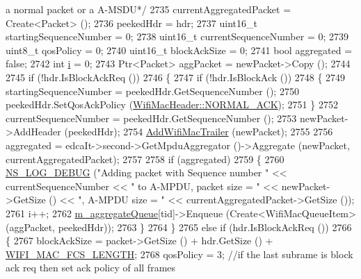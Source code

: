 \begin{DoxyCode}
{       a normal packet or a A-MSDU*/}
2735               currentAggregatedPacket = Create<Packet> ();
2736               peekedHdr = hdr;
2737               uint16\_t startingSequenceNumber = 0;
2738               uint16\_t currentSequenceNumber = 0;
2739               uint8\_t qosPolicy = 0;
2740               uint16\_t blockAckSize = 0;
2741               \textcolor{keywordtype}{bool} aggregated = \textcolor{keyword}{false};
2742               \textcolor{keywordtype}{int} \hyperlink{bernuolliDistribution_8m_a6f6ccfcf58b31cb6412107d9d5281426}{i} = 0;
2743               Ptr<Packet> aggPacket = newPacket->Copy ();
2744 
2745               \textcolor{keywordflow}{if} (!hdr.IsBlockAckReq ())
2746                 \{
2747                   \textcolor{keywordflow}{if} (!hdr.IsBlockAck ())
2748                     \{
2749                       startingSequenceNumber = peekedHdr.GetSequenceNumber ();
2750                       peekedHdr.SetQosAckPolicy (\hyperlink{classns3_1_1WifiMacHeader_ae3a382482f357972019f5e1b3162adc4a9f52b9c6ca65d046ce2be9d70bce28cf}{WifiMacHeader::NORMAL\_ACK});
2751                     \}
2752                   currentSequenceNumber = peekedHdr.GetSequenceNumber ();
2753                   newPacket->AddHeader (peekedHdr);
2754                   \hyperlink{classns3_1_1MacLow_acaafc67755f16f347e9161310d71e3ef}{AddWifiMacTrailer} (newPacket);
2755 
2756                   aggregated = edcaIt->second->GetMpduAggregator ()->Aggregate (newPacket, 
      currentAggregatedPacket);
2757 
2758                   \textcolor{keywordflow}{if} (aggregated)
2759                     \{
2760                       \hyperlink{group__logging_ga413f1886406d49f59a6a0a89b77b4d0a}{NS\_LOG\_DEBUG} (\textcolor{stringliteral}{"Adding packet with Sequence number "} << 
      currentSequenceNumber << \textcolor{stringliteral}{" to A-MPDU, packet size = "} << newPacket->GetSize () << \textcolor{stringliteral}{", A-MPDU size = "} << 
      currentAggregatedPacket->GetSize ());
2761                       i++;
2762                       \hyperlink{classns3_1_1MacLow_a50ea30f5dff00a3ef2683b9275717c6f}{m\_aggregateQueue}[tid]->Enqueue (Create<WifiMacQueueItem> (aggPacket, 
      peekedHdr));
2763                     \}
2764                 \}
2765               \textcolor{keywordflow}{else} \textcolor{keywordflow}{if} (hdr.IsBlockAckReq ())
2766                 \{
2767                   blockAckSize = packet->GetSize () + hdr.GetSize () + 
      \hyperlink{namespacens3_a29f18a113e117817e22278a743437c08}{WIFI\_MAC\_FCS\_LENGTH};
2768                   qosPolicy = 3; \textcolor{comment}{//if the last subrame is block ack req then set ack policy of all frames
}
\end{DoxyCode}
